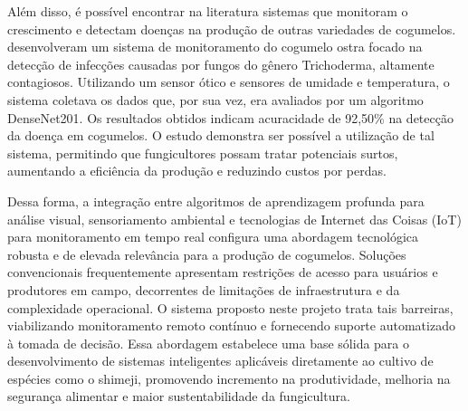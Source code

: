 Além disso, é possível encontrar na literatura sistemas que monitoram o crescimento e detectam doenças na produção de outras variedades de cogumelos. \cite{Nuankaew2025} desenvolveram um sistema de monitoramento do cogumelo ostra focado na detecção de infecções causadas por fungos do gênero Trichoderma, altamente contagiosos. Utilizando um sensor ótico e sensores de umidade e temperatura, o sistema coletava os dados que, por sua vez, era avaliados por um algoritmo DenseNet201. Os resultados obtidos indicam acuracidade de 92,50\% na detecção da doença em cogumelos. O estudo demonstra ser possível a utilização de tal sistema, permitindo que fungicultores possam tratar potenciais surtos, aumentando a eficiência da produção e reduzindo custos por perdas. 

Dessa forma, a integração entre algoritmos de aprendizagem profunda para análise visual, sensoriamento ambiental e tecnologias de Internet das Coisas (IoT) para monitoramento em tempo real configura uma abordagem tecnológica robusta e de elevada relevância para a produção de cogumelos. Soluções convencionais frequentemente apresentam restrições de acesso para usuários e produtores em campo, decorrentes de limitações de infraestrutura e da complexidade operacional. O sistema proposto neste projeto trata tais barreiras, viabilizando monitoramento remoto contínuo e fornecendo suporte automatizado à tomada de decisão. Essa abordagem estabelece uma base sólida para o desenvolvimento de sistemas inteligentes aplicáveis diretamente ao cultivo de espécies como o shimeji, promovendo incremento na produtividade, melhoria na segurança alimentar e maior sustentabilidade da fungicultura.